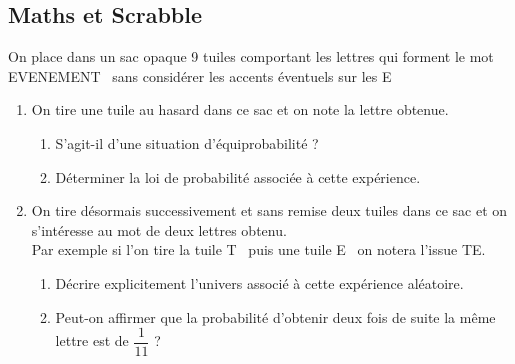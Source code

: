 \documentclass[oneside,12pt]{article}          %
\begin{document}
\subsection{Maths et Scrabble}
On place dans un sac opaque 9 tuiles comportant les lettres qui forment le mot \og EVENEMENT \fg \, sans considérer les accents éventuels sur les \og E \fg
\begin{enumerate}
	\item On tire une tuile au hasard dans ce sac et on note la lettre obtenue.
	\begin{enumerate}
		\item S'agit-il d'une situation d'équiprobabilité ?
		\item Déterminer la loi de probabilité associée à cette expérience.
	\end{enumerate}
	\item On tire désormais successivement et sans remise deux tuiles dans ce sac et on s'intéresse au mot de deux lettres obtenu.\\
	Par exemple si l'on tire la tuile \og T \fg \, puis une tuile \og E \fg \, on notera l'issue TE.
	\begin{enumerate}
		\item Décrire explicitement l'univers associé à cette expérience aléatoire.
		\item Peut-on affirmer que la probabilité d'obtenir deux fois de suite la même lettre est de $\dfrac{1}{11}$ ?
	\end{enumerate}
\end{enumerate}
\end{document}
